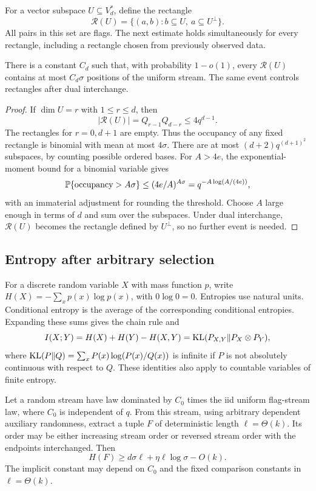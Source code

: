 For a vector subspace $U\subseteq V_d^*$, define the rectangle
\[
 \mathcal R(U)=
 \{(a,b):b\subseteq U,\ a\subseteq U^\perp\}.
\]
All pairs in this set are flags. The next estimate holds simultaneously
for every rectangle, including a rectangle chosen from previously
observed data.

\begin{lemma}
\label{base:rectangles}
There is a constant $C_d$ such that, with probability $1-o(1)$, every
$\mathcal R(U)$ contains at most $C_d\sigma$ positions of the uniform
stream. The same event controls rectangles after dual interchange.
\end{lemma}

\begin{proof}
If $\dim U=r$ with $1\le r\le d$, then
\[
 |\mathcal R(U)|=Q_{r-1}Q_{d-r}\le4q^{d-1}.
\]
The rectangles for $r=0,d+1$ are empty. Thus the occupancy of any
fixed rectangle is binomial with mean at most $4\sigma$. There are
at most $(d+2)q^{(d+1)^2}$ subspaces, by counting possible ordered
bases. For $A>4e$, the exponential-moment bound for a binomial variable
gives
\[
 \mathbb P\{\text{occupancy}>A\sigma\}
 \le (4e/A)^{A\sigma}
 =q^{-A\log(A/(4e))},
\]
with an immaterial adjustment for rounding the threshold. Choose $A$
large enough in terms of $d$ and sum over the subspaces. Under dual
interchange, $\mathcal R(U)$ becomes the rectangle defined by
$U^\perp$, so no further event is needed.
\end{proof}

\subsection{Entropy after arbitrary selection}

For a discrete random variable $X$ with mass function $p$, write
$H(X)=-\sum_xp(x)\log p(x)$, with $0\log0=0$. Entropies use natural
units. Conditional entropy is the average of the corresponding
conditional entropies. Expanding these sums gives the chain rule and
\[
 I(X;Y)=H(X)+H(Y)-H(X,Y)
       =\operatorname{KL}(P_{X,Y}\Vert P_X\otimes P_Y),
\]
where $\operatorname{KL}(P\Vert Q)=\sum_xP(x)\log(P(x)/Q(x))$ is infinite if
$P$ is not absolutely continuous with respect to $Q$. These identities
also apply to countable variables of finite entropy.

\begin{lemma}
\label{base:selection-entropy}
Let a random stream have law dominated by $C_0$ times the iid uniform
flag-stream law, where $C_0$ is independent of $q$. From this stream,
using arbitrary dependent auxiliary randomness, extract a tuple $F$
of deterministic length $\ell=\Theta(k)$. Its order may be either
increasing stream order or reversed stream order with the endpoints
interchanged. Then
\begin{equation}
 H(F)\ge d\sigma\ell+\eta\ell\log\sigma-O(k).
 \label{base:entropy-lower}
\end{equation}
The implicit constant may depend on $C_0$ and the fixed comparison
constants in $\ell=\Theta(k)$.
\end{lemma}

